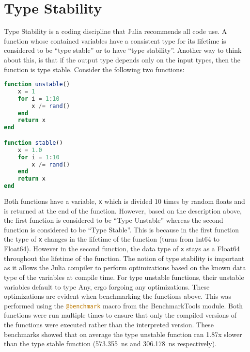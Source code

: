 \section{Type Stability}
\label{TypeStability}
Type Stability is a coding discipline that Julia recommends all code use. A function whose contained variables have a
consistent type for its lifetime is considered to be ``type stable'' or to have ``type stability''. Another way to think
about this, is that if the output type depends only on the input types, then the function is type stable. Consider the
following two functions: 
\begin{lstlisting}[language=Julia]
function unstable()
    x = 1
    for i = 1:10
        x /= rand()
    end
    return x
end

function stable()
    x = 1.0
    for i = 1:10
        x /= rand()
    end
    return x
end
\end{lstlisting}
Both functions have a variable, \lstinline[language=Julia]{x} which is divided 10 times by random floats and is returned
at the end of the function. However, based on the description above, the first function is considered to be ``Type
Unstable'' whereas the second function is considered to be ``Type Stable''. This is because in the first function the
type of \lstinline[language=Julia]{x} changes in the lifetime of the function (turns from Int64 to Float64). However in
the second function, the data type of \lstinline[language=Julia]{x} stays as a Float64 throughout the lifetime of the
function. The notion of type stability is important as it allows the Julia compiler to perform optimizations based on
the known data type of the variables at compile time. For type unstable functions, their unstable variables default to
type Any, ergo forgoing any optimizations. These optimizations are evident when benchmarking the functions above. This
was performed using the \lstinline[language=Julia]{@benchmark} macro from the BenchmarkTools module. Both functions were
run multiple times to ensure that only the compiled versions of the functions were executed rather than the interpreted
version. These benchmarks showed that on average the type unstable function ran 1.87x slower than the type stable
function (573.355~ns and 306.178~ns respectively).  

